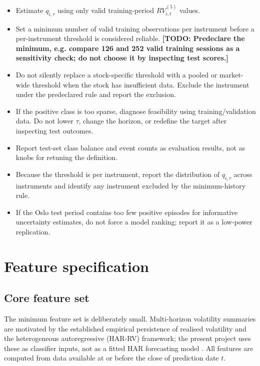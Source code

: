 \documentclass[11pt,a4paper]{article}
\newcommand{\todo}[1]{\textcolor{red!75!black}{\textbf{[TODO: #1]}}}
\begin{document}
\begin{itemize}
  \item Estimate $q_{i,\tau}$ using only valid training-period $RV_{i,t}^{(5)}$ values.
  \item Set a minimum number of valid training observations per instrument before a per-instrument threshold is considered reliable. \todo{Predeclare the minimum, e.g. compare 126 and 252 valid training sessions as a sensitivity check; do not choose it by inspecting test scores.}
  \item Do not silently replace a stock-specific threshold with a pooled or market-wide threshold when the stock has insufficient data. Exclude the instrument under the predeclared rule and report the exclusion.
  \item If the positive class is too sparse, diagnose feasibility using training/validation data. Do not lower $\tau$, change the horizon, or redefine the target after inspecting test outcomes.
  \item Report test-set class balance and event counts as evaluation results, not as knobs for retuning the definition.
  \item Because the threshold is per instrument, report the distribution of $q_{i,\tau}$ across instruments and identify any instrument excluded by the minimum-history rule.
  \item If the Oslo test period contains too few positive episodes for informative uncertainty estimates, do not force a model ranking; report it as a low-power replication.

\end{itemize}

\section{Feature specification}
\label{sec:features}

\subsection{Core feature set}

The minimum feature set is deliberately small. Multi-horizon volatility summaries are motivated by the established empirical persistence of realised volatility and the heterogeneous autoregressive (HAR-RV) framework; the present project uses these as classifier inputs, not as a fitted HAR forecasting model \cite{Corsi2009}. All features are computed from data available at or before the close of prediction date $t$.
\end{document}
